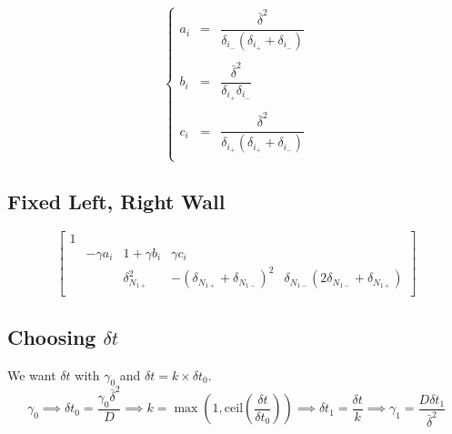 \documentclass[aps,11pt]{revtex4}
\begin{document}
\begin{equation}
\left\lbrace
\begin{array}{rcc}
	a_i & = & \dfrac{\bar{\delta}^2}{\delta_{i_-}(\delta_{i_+}+\delta_{i_-})}\\
	\\
	b_i & = & \dfrac{\bar{\delta}^2}{\delta_{i_+}\delta_{i_-}}\\
	\\
	c_i & = & \dfrac{\bar{\delta}^2}{\delta_{i_+}(\delta_{i_+}+\delta_{i_-})}\\
\end{array}
\right.
\end{equation}

\subsection{Fixed Left, Right Wall}
\begin{equation}
\begin{bmatrix}
1 & \\
   & -\gamma a_i & 1+ \gamma b_i & \gamma c_i &\\
   & &  \delta_{N_{1+}}^2       &     -(\delta_{N_{1+}}+\delta_{N_{1-}})^2          & \delta_{N_{1-}}(2\delta_{N_{1-}}+\delta_{N_{1+}}) \\
\end{bmatrix}
\end{equation}

\subsection{Choosing $\delta t$}
We want $\delta t$ with $\gamma_0$ and $\delta t = k \times \delta t_0$.
$$
	\gamma_0 \implies \delta t_0 = \dfrac{\gamma_0 \bar{\delta}^2}{D} \implies
	k = \max\left(1,\mathrm{ceil}\left(\dfrac{\delta t}{\delta t_0}\right)\right)
	\implies \delta t_1 = \dfrac{\delta t}{k} \implies \gamma_1 = \dfrac{D\delta t_1}{\bar{\delta}^2}
$$
\end{document}
